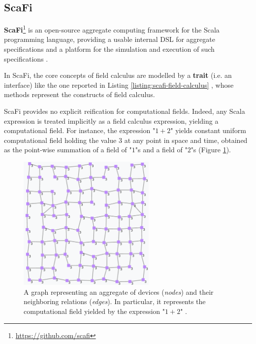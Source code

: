 
\subsection{ScaFi}

\textbf{\ac{ScaFi}}\footnote{\url{https://github.com/scafi}} is an
open-source aggregate computing framework for the Scala programming language,
providing a usable internal \ac{DSL} for aggregate specifications and a
platform for the simulation and execution of such specifications
\cite{ScaFi-Documentation}.

In \ac{ScaFi}, the core concepts of field calculus are modelled by a
\textbf{trait} (i.e. an interface) like the one reported in Listing
\ref{listing:scafi-field-calculus} \cite{FieldCalculus-AggregateComputing},
whose methods represent the constructs of field calculus.



\ac{ScaFi} provides no explicit reification for computational fields. Indeed,
any Scala expression is treated implicitly as a field calculus expression,
yielding a computational field. For instance, the expression "$1+2$" yields
constant uniform computational field holding the value $3$ at any point in
space and time, obtained as the point-wise summation of a field of "$1$"s and a
field of "$2$"s (Figure \ref{figure:constant-uniform-field}).

\begin{figure}[h]
  \centering
  \includegraphics[width=0.60\textwidth]{resources/figures/constant-uniform-field.png}
  \caption{
    A graph representing an aggregate of devices (\textit{nodes}) and their
    neighboring relations (\textit{edges}). In particular, it represents the
    computational field yielded by the expression "$1+2$"
    \cite{ScaFi-Documentation}.
  }
  \label{figure:constant-uniform-field}
\end{figure}

